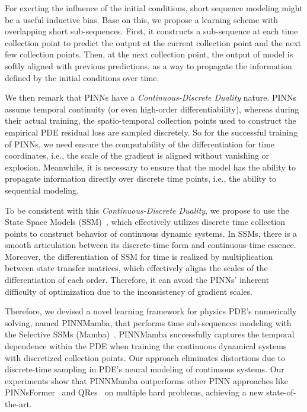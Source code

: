 For exerting the influence of the initial conditions, short sequence modeling might be a useful inductive bias. Base on this, we propose a learning scheme with overlapping short sub-sequences. First, it constructs a sub-sequence at each time collection point to predict the output at the current collection point and the next few collection points. Then, at the next collection point, the output of model is softly aligned with previous predictions, as a way to propagate the information defined by the initial conditions over time.

We then remark that PINNs have a \textit{Continuous-Discrete Duality} nature. 
    PINNs assume temporal continuity (or even high-order differentiability), whereas during their actual training, the spatio-temporal collection points used to construct the empirical PDE residual loss are sampled discretely. 
So for the successful training of PINNs, we need ensure the computability of the differentiation for time coordinates, i.e., the scale of the gradient is aligned without vanishing or explosion. 
    Meanwhile, it is necessary to ensure that the model has the ability to propagate information directly over discrete time points, i.e., the ability to sequential modeling.

To be consistent with this \textit{Continuous-Discrete Duality}, we propose to use the State Space Models (SSM)~\cite{gu2023mamba,gu2022efficiently}, which effectively utilizes discrete time collection points to construct behavior of continuous dynamic systems. 
    In SSMs, there is a smooth articulation between its discrete-time form and continuous-time essence. Moreover, the differentiation of SSM for time is realized by multiplication between state transfer matrices, which effectively aligns the scales of the differentiation of each order. Therefore, it can avoid the PINNs' inherent difficulty of optimization due to the inconsistency of gradient scales.

Therefore, we devised a novel learning framework for physics PDE's numerically solving, named PINNMamba, that performs time sub-sequences modeling with the Selective SSMs (Mamba)~\cite{gu2023mamba}. PINNMamba successfully captures the temporal dependence within the PDE when training the continuous dynamical systems with discretized collection points. Our approach eliminates distortions due to discrete-time sampling in PDE's neural modeling of continuous systems. Our experiments show that PINNMamba outperforms other PINN approaches
like PINNsFormer~\cite{zhao2024pinnsformer} and QRes~\cite{bu2021quadratic} on multiple hard problems, achieving a new state-of-the-art.

